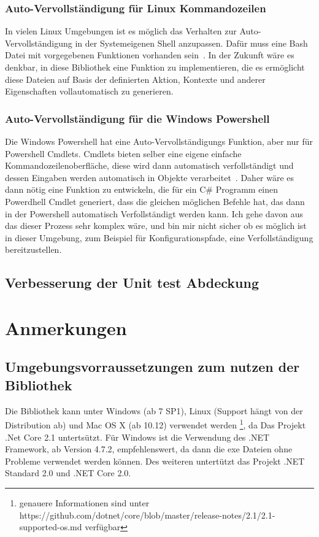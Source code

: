 \documentclass[a4paper,11pt,titlepage,ngerman]{article}
\begin{document}
\begin{sloppypar}
  \subsubsection{Auto-Vervollständigung für Linux Kommandozeilen}
  In vielen Linux Umgebungen ist es möglich das Verhalten zur Auto-Vervollständigung in der Systemeigenen Shell anzupassen.
  Dafür muss eine Bash Datei mit vorgegebenen Funktionen vorhanden sein~\cite{BashAutoComplete}.
  In der Zukunft wäre es denkbar, in diese Bibliothek eine Funktion zu implementieren, die es ermöglicht diese Dateien auf Basis der definierten Aktion,
  Kontexte und anderer Eigenschaften vollautomatisch zu generieren.
  \subsubsection{Auto-Vervollständigung für die Windows Powershell}
  Die Windows Powershell hat eine Auto-Vervollständigungs Funktion, aber nur für Powershell Cmdlets.
  Cmdlets bieten selber eine eigene einfache Kommandozeilenoberfläche, diese wird dann automatisch verfollständigt und dessen Eingaben werden automatisch in Objekte verarbeitet~\cite{CustomCmdlet}.
  Daher wäre es dann nötig eine Funktion zu entwickeln, die für ein C\# Programm einen Powerdhell Cmdlet generiert, dass die gleichen möglichen Befehle hat, 
  das dann in der Powershell automatisch Verfollständigt werden kann.
    Ich gehe davon aus das dieser Prozess sehr komplex wäre, und bin mir nicht sicher ob es möglich ist in dieser Umgebung, zum Beispiel für Konfigurationspfade, eine Verfollständigung bereitzustellen.
  \subsection{Verbesserung der Unit test Abdeckung}\label{subsec:MoreUnitTests}
  \section{Anmerkungen}\label{sec:AdditionalNotes}
  \subsection{Umgebungsvorraussetzungen zum nutzen der Bibliothek}\label{subsec:SystemRequirements}
   Die Bibliothek kann unter Windows (ab 7 SP1), Linux (Support hängt von der Distribution ab) und Mac OS X (ab 10.12) verwendet werden
  \footnote{genauere Informationen sind unter https://github.com/dotnet/core/blob/master/release-notes/2.1/2.1-supported-os.md verfügbar}, 
  da Das Projekt .Net Core 2.1 untertsützt.
  Für Windows ist die Verwendung des .NET Framework, ab Version 4.7.2, empfehlenswert, da dann die exe Dateien ohne Probleme verwendet werden können.
  Des weiteren untertützt das Projekt .NET Standard 
2.0 und .NET Core 2.0.

\end{sloppypar}
\end{document}
